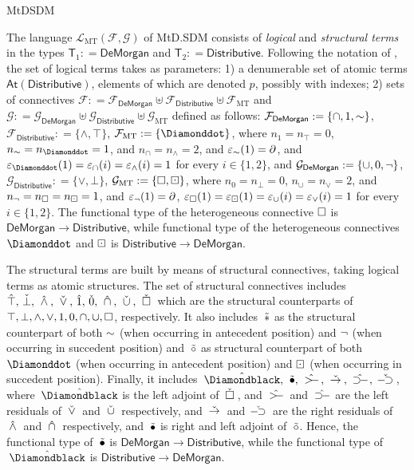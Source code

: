 \begin{entry}{MtDSDM}
\begin{clarifications}
The language $\mathcal{L}_\mathrm{MT}(\mathcal{F}, \mathcal{G})$ of  MtD.SDM consists of  {\em logical}   and {\em structural terms} in the types $\mathsf{T}_1:  = \mathsf{De Morgan}$ and $\mathsf{T}_2: = \mathsf{Distributive}$. Following the notation of , the set  of logical terms takes as parameters: 1) a denumerable  set of atomic terms $\mathsf{At}(\mathsf{Distributive})$, elements of which are denoted $p$, possibly with indexes; 2)  sets of connectives $\mathcal{F}: = \mathcal{F}_{\mathsf{De Morgan}}\uplus\mathcal{F}_{\mathsf{Distributive}}\uplus\mathcal{F}_{\mathrm{MT}}$ and $\mathcal{G}: = \mathcal{G}_{\mathsf{De Morgan}}\uplus\mathcal{G}_{\mathsf{Distributive}}\uplus\mathcal{G}_{\mathrm{MT}}$ defined as follows:
$\mathcal{F}_{\mathsf{De Morgan}}: = \{\cap, 1, {\sim}\}$, $\mathcal{F}_{\mathsf{Distributive}}: = \{\wedge, \top \}$, $\mathcal{F}_{\mathrm{MT}}: = \{\wdia\}$, where  $n_1 = n_\top = 0$, $n_{\dneg} = n_{\wdia} = 1$, and $n_\cap = n_\wedge = 2$, and $\varepsilon_{{\sim}}(1)=\partial$, and $\varepsilon_{\wdia}(1) = \varepsilon_{\cap}(i) = \varepsilon_{\wedge}(i) = 1$ for every $i\in \{1, 2\}$, and
$\mathcal{G}_{\mathsf{De Morgan}}: = \{\cup, 0, \neg\}$, $\mathcal{G}_{\mathsf{Distributive}}: = \{\vee, \bot \}$, $\mathcal{G}_{\mathrm{MT}}: = \{\Box, \boxdot\}$, where $n_0 = n_\bot = 0$, $n_\cup = n_\vee = 2$, and $n_{\neg} = n_{\Box} = n_{\boxdot} = 1$, and $\varepsilon_{\neg}(1)=\partial$, $\varepsilon_{\Box}(1) =\varepsilon_{\boxdot}(1) = \varepsilon_{\cup}(i) = \varepsilon_{\vee}(i) = 1$ for every $i\in \{1, 2\}$. The functional type of the heterogeneous connective $\Box$ is $\mathsf{De Morgan}\rightarrow \mathsf{Distributive}$, while functional type of the heterogeneous connectives $\wdia$ and $\boxdot$ is $\mathsf{Distributive}\rightarrow \mathsf{De Morgan}$.

The structural terms are built by means of structural connectives, taking logical terms as atomic structures. The set of structural connectives includes  $\hat{\top},\, \check{\bot},\, \:\hat{\wedge}\:,\, \:\check{\vee}\:,\, \hat{1},\, \check{0}, \, \:\hat{\cap}\:,\, \:\check{\cup}\:,\,  \:\check{\Box}\: $   which are the structural counterparts of $\top, \bot,  \wedge, \vee,   1, 0,    \cap, \cup, \Box$, respectively.  It also includes $\:\tilde{*}$ as the structural counterpart of both ${\sim}$ (when occurring in antecedent position) and $\neg$ (when occurring in succedent position) and $\:\tilde{{\circ}}$ as structural counterpart of both $\wdia$ (when occurring in antecedent position) and $\boxdot$ (when occurring in succedent position). Finally, it includes  $\BDIA,\, \BCIR,\, \XCRARR,\, \XRARR,\, \DCRARR ,\, \DRARR $, where $\BDIA$ is the left adjoint of $\:\check{\Box}\:$, and $\XCRARR$ and $\DCRARR$ are the left  residuals of $\:\check{\vee}\:$ and $\:\check{\cup}\:$ respectively, and $\:\check{\rightarrow}\:$ and $\DRARR$ are the right residuals of $\:\hat{\wedge}\:$ and $\:\hat{\cap}\:$ respectively, and $\:\tilde{{\bullet}}$ is right and left adjoint of $\:\tilde{{\circ}}$. Hence, the functional type of $\:\tilde{{\bullet}}$ is  $\mathsf{De Morgan}\rightarrow \mathsf{Distributive}$, while the functional type of  $\BDIA$ is $\mathsf{Distributive}\rightarrow \mathsf{De Morgan}$.


\end{clarifications}
\end{entry}
